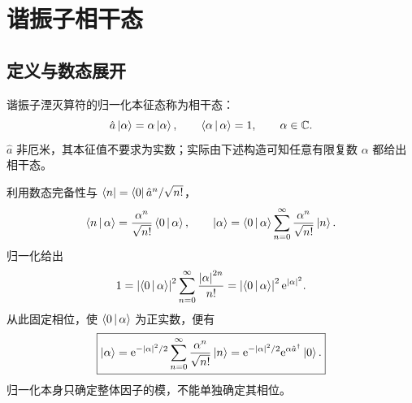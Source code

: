 \section{谐振子相干态}
\subsection{定义与数态展开}
\begin{definition}
谐振子湮灭算符的归一化本征态称为相干态：
\begin{equation}
\hat a\Ket{\alpha}=\alpha\Ket{\alpha},\qquad
\Braket{\alpha|\alpha}=1,\qquad\alpha\in\mathbb{C}.
\end{equation}
$\hat a$ 非厄米，其本征值不要求为实数；实际由下述构造可知任意有限复数 $\alpha$ 都给出相干态。
\end{definition}
利用数态完备性与 $\Bra{n}=\Bra{0}\hat a^n/\sqrt{n!}$，
\begin{equation}
\Braket{n|\alpha}=\frac{\alpha^n}{\sqrt{n!}}\Braket{0|\alpha},\qquad
\Ket{\alpha}=\Braket{0|\alpha}\sum_{n=0}^{\infty}\frac{\alpha^n}{\sqrt{n!}}\Ket{n}.
\end{equation}
归一化给出
\begin{equation}
1=\left|\Braket{0|\alpha}\right|^2\sum_{n=0}^{\infty}\frac{\left|\alpha\right|^{2n}}{n!}
=\left|\Braket{0|\alpha}\right|^2\mathrm{e}^{\left|\alpha\right|^2}.
\end{equation}
从此固定相位，使 $\Braket{0|\alpha}$ 为正实数，便有
\begin{equation}
\boxed{\Ket{\alpha}=\mathrm{e}^{-\left|\alpha\right|^2/2}
\sum_{n=0}^{\infty}\frac{\alpha^n}{\sqrt{n!}}\Ket{n}
=\mathrm{e}^{-\left|\alpha\right|^2/2}\mathrm{e}^{\alpha\hat a^\dagger}\Ket{0}.}
\label{eq:coherent-expansion}
\end{equation}
归一化本身只确定整体因子的模，不能单独确定其相位。

